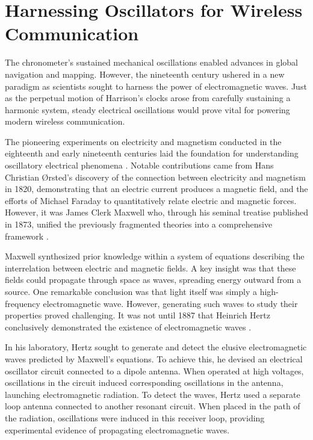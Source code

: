 \section{Harnessing Oscillators for Wireless Communication}

The chronometer's sustained mechanical oscillations enabled  advances in global navigation and mapping. However, the nineteenth century ushered in a new paradigm as scientists sought to harness the power of electromagnetic waves. Just as the perpetual motion of Harrison's clocks arose from carefully sustaining a harmonic system, steady electrical oscillations would prove vital for powering modern wireless communication.

The pioneering experiments on electricity and magnetism conducted in the eighteenth and early nineteenth centuries laid the foundation for understanding oscillatory electrical phenomena \citep{Baigrie2006}. Notable contributions came from Hans Christian Ørsted's discovery of the connection between electricity and magnetism in 1820, demonstrating that an electric current produces a magnetic field, and the efforts of Michael Faraday to quantitatively relate electric and magnetic forces. However, it was James Clerk Maxwell who, through his seminal treatise published in 1873, unified the previously fragmented theories into a comprehensive framework \citep{Maxwell2011-a,Maxwell2011-b}.

Maxwell synthesized prior knowledge within a system of equations describing the interrelation between electric and magnetic fields. A key insight was that these fields could propagate through space as waves, spreading energy outward from a source. One remarkable conclusion was that light itself was simply a high-frequency electromagnetic wave. However, generating such waves to study their properties proved challenging. It was not until 1887 that Heinrich Hertz conclusively demonstrated the existence of electromagnetic waves \citep{Shamos1987}.

In his laboratory, Hertz sought to generate and detect the elusive electromagnetic waves predicted by Maxwell's equations. To achieve this, he devised an electrical oscillator circuit connected to a dipole antenna. When operated at high voltages, oscillations in the circuit induced corresponding oscillations in the antenna, launching electromagnetic radiation. To detect the waves, Hertz used a separate loop antenna connected to another resonant circuit. When placed in the path of the radiation, oscillations were induced in this receiver loop, providing experimental evidence of propagating electromagnetic waves.

